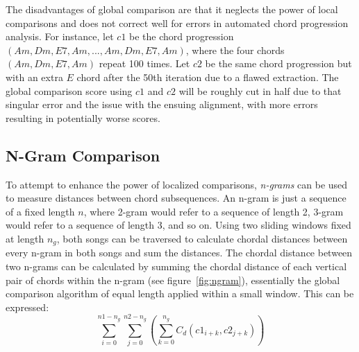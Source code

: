 The disadvantages of global comparison are that it neglects the power of local comparisons and does not correct well for errors in automated chord progression analysis. For instance, let ${c1}$ be the chord progression $(Am, Dm, E7, Am, ... , Am, Dm, E7, Am)$, where the four chords $(Am, Dm, E7, Am)$ repeat 100 times. Let ${c2}$ be the same chord progression but with an extra $E$ chord after the 50th iteration due to a flawed extraction. The global comparison score using ${c1}$ and ${c2}$ will be roughly cut in half due to that singular error and the issue with the ensuing alignment, with more errors resulting in potentially worse scores.

\subsection{N-Gram Comparison}

To attempt to enhance the power of localized comparisons, \textit{n-grams} can be used to measure distances between chord subsequences. An n-gram is just a sequence of a fixed length $n$, where 2-gram would refer to a sequence of length 2, 3-gram would refer to a sequence of length 3, and so on. Using two sliding windows fixed at length $n_g$, both songs can be traversed to calculate chordal distances between every n-gram in both songs and sum the distances. The chordal distance between two n-grams can be calculated by summing the chordal distance of each vertical pair of chords within the n-gram (see figure~\ref{fig:ngram}), essentially the global comparison algorithm of equal length applied within a small window. This can be expressed: \[\sum_{i=0}^{n1 - n_g} \sum_{j=0}^{n2 - n_g} \left( \sum_{k=0}^{n_g} C_d({c1}_{i+k}, {c2}_{j+k}) \right) \]